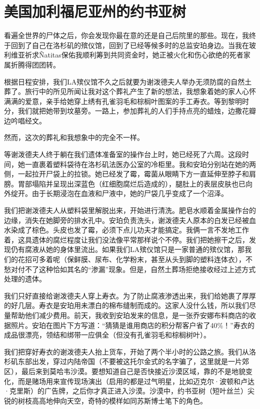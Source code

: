 \documentclass[12pt,oneside]{book}
\begin{document}
\section{美国加利福尼亚州的约书亚树}
\begin{bookref}[frametitle={\cite{好好告别：世界葬礼观察手记}}]

看遍全世界的尸体之后，你会发现你最在意的还是自己后院里的那些。现在，我终于回到了自己在洛杉矶的殡仪馆，回到了已经等候多时的总监安珀身边。当我在玻利维亚祈求Ñatitas保佑我顺利筹到共同资金时，她正被火化和伤心欲绝的死者家属折腾得团团转。

根据日程安排，我们LA殡仪馆不久之后就要为谢泼德夫人举办无须防腐的自然土葬了。旅行中的所见所闻让我对这个葬礼产生了新的想法，我想象着她的家人心怀满满的爱意，亲手给她穿上绣有孔雀羽毛和棕榈叶图案的手工寿衣。等到黎明时分，我们就把她带到坟墓旁。一路上，参加葬礼的人们手持点亮的蜡烛，边撒花瓣边吟唱经文。

然而，这次的葬礼和我想象中的完全不一样。

等谢泼德夫人终于躺在我们遗体准备室的操作台上时，她已经死了六周。这段时间，她一直裹着塑料袋待在洛杉矶法医办公室的冷柜里。我和安珀分别站在她的两侧，一起拉开尸袋上的拉锁。她已经发了霉，霉菌从眼睛下方一直延伸至脖子和肩膀。胃部塌陷并呈现出深蓝色（红细胞腐烂后造成的），腿肚上的表层皮肤也已向外绽开。由于长期浸泡在血液和尸液中，她的尸袋几乎变成了一个沼泽。

我们把谢泼德夫人从塑料袋里解脱出来，开始进行清洗。肥皂水顺着金属操作台的边缘，消失在她脚旁的排水孔中。安珀负责洗头，谢泼德夫人原本的白发已经被血水染成了棕色。头皮也发了霉，必须下点儿功夫才能搞定。我俩一言不发地工作着，这具遗体的腐烂程度让我们没法像平常那样说个不停。我们把她擦干之后，发现仍有腐液从她的身体里流出。如果我们LA殡仪馆只是一家普通的殡仪馆，那我们的花招可多着呢（保鲜膜、尿布、化学粉末，甚至从头到脚的塑料连体衣），不愁对付不了这种恰如其名的“渗漏”现象。但是，自然土葬场拒绝接收经过上述方式处理的遗体。

我们只好直接给谢泼德夫人穿上寿衣。为了防止腐液渗透出来，我们给她裹了厚厚的好几层。寿衣是安珀用未漂白的棉布缝制而成的。这家人没什么钱，所以我们尽量帮助他们减少费用。前天，我收到安珀发来的信息，是一张乔安娜布料商店的收据照片。安珀在图片下方写道：“猜猜是谁用商店的积分帮客户省了40\%！”寿衣的成品很漂亮，领结和绑带一应俱全（但没有孔雀羽毛和棕榈树叶）。

我们把穿好寿衣的谢泼德夫人抬上货车，开始了两个半小时的公路之旅。我们从洛杉矶东部出发，穿过内陆帝国（不要被这托尔金式的名字骗了，这里就是一片郊区），最后来到莫哈韦沙漠。要想知道自己是否快接近沙漠区域，靠的不是地貌变化，而是赌场用来宣传现场演出（启用的都是过气明星，比如迈克尔·波顿和卢达·克里斯）的广告牌，之后你才真正进入沙漠。沙漠中，约书亚树（短叶丝兰）尖锐的树枝高高地伸向天空，奇特的模样如同苏斯博士笔下的角色。


\end{bookref}
\end{document}
